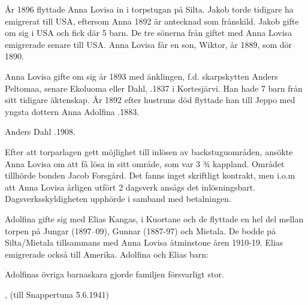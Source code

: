 År 1896 flyttade Anna Lovisa in i torpstugan på Silta. Jakob torde tidigare ha emigrerat till USA, eftersom Anna 1892 är antecknad som frånskild. Jakob gifte om sig i USA och fick där 5 barn. De tre sönerna från giftet med Anna Lovisa emigrerade senare till USA. Anna Lovisa får en son, Wiktor, år 1889, som dör 1890.

Anna Lovisa gifte om sig år 1893 med änklingen, f.d. skarpskytten Anders Peltomaa, senare Ekoluoma eller Dahl, .1837 i Kortesjärvi. Han hade 7 barn från sitt tidigare äktenskap. År 1892 efter hustruns död flyttade han till Jeppo med yngsta dottern Anna Adolfina .1883.

Anders Dahl .1908.

Efter att torparlagen gett möjlighet till inlösen av backstuguområden, ansökte Anna Lovisa om att få lösa in sitt område, som var 3 ¾ kappland. Området tillhörde bonden Jacob Forsgård. Det fanns inget skriftligt kontrakt, men i.o.m att Anna Lovisa årligen utfört 2 dagsverk ansågs det inlösningsbart. Dagsverksskyldigheten upphörde i samband med betalningen.

Adolfina gifte sig med Elias Kangas,  i Kuortane och de flyttade en hel del mellan torpen på Jungar (1897--09), Gunnar (1887-97) och Mietala. De bodde på Silta/Mietala tillsammans med Anna Lovisa åtminstone åren 1910-19. Elias emigrerade också till Amerika. Adolfina och Elias barn:
\begin{jhchildren}
  \item {}
  \item {}
\end{jhchildren}

Adolfinas övriga barnaskara gjorde familjen försvarligt stor.
\begin{jhchildren}
  \item {}
  \item {}
  \item {}
  \item {}
  \item {}, (till Snappertuna 5.6.1941)
  \item {}
\end{jhchildren}

